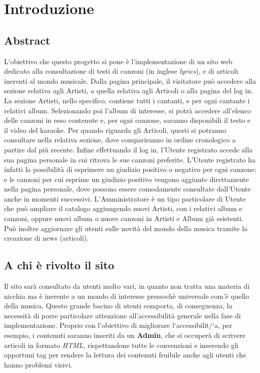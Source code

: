 \section{Introduzione}

\subsection{Abstract}
L`obiettivo che questo progetto si pone \`e l'implementazione di un sito web dedicato alla consultazione di testi di canzoni (in inglese \textit{lyrics}), e di articoli inerenti al mondo musicale. 
Dalla pagina principale, il visitatore pu\`o accedere alla sezione relativa agli Artisti, a quella relativa agli Articoli o alla pagina del log in.
La sezione Artisti, nello specifico, contiene tutti i cantanti, e per ogni cantante i relativi album. Selezionando poi l'album di interesse, si potr\`a accedere all'elenco delle canzoni in esso contenute e, per ogni canzone, saranno disponibili il testo e il video del karaoke.
Per quando riguarda gli Articoli, questi si potranno consultare nella relativa sezione, dove compariranno in ordine cronologico a partire dal pi\`u recente.
Infine effettuando il log in, l'Utente registrato accede alla sua pagina personale in cui ritrova le sue canzoni preferite. L'Utente registrato ha infatti la possibilit\`a di esprimere un giudizio positivo o negativo per ogni canzone; e le canzoni per cui esprime un giudizio positivo vengono aggiunte direttamente nella pagina personale, dove possono essere comodamente consultate dall'Utente anche in momenti successivi.
L'Amministratore è un tipo particolare di Utente che pu\`o ampliare il catalogo aggiungendo nuovi Artisti, con i relativi album e canzoni, oppure nuovi album o nuove canzoni in Artisti e Album gi\`a esistenti. Può inoltre aggiornare gli utenti sulle novità del mondo della musica tramite la creazione di news (articoli).


\subsection{A chi è rivolto il sito}
Il sito sar\`a consultato da utenti molto vari, in quanto non tratta una materia di nicchia ma \`e inerente a un mondo di interesse pressoch\`e universale com'\`e quello della musica. Questo grande bacino di utenti comporta, di conseguenza, la necessit\`a di porre particolare attenzione all'accessibilit\`a generale nella fase di implementazione. Proprio con l'obiettivo di migliorare l`accessibilit/`a, per esempio, i contenuti saranno inseriti da un \textbf{Admin}, che si occuperà di scrivere articoli in formato \textit{HTML}, rispettandone tutte le convenzioni e inserendo gli opportuni tag per rendere la lettura dei contenuti fruibile anche agli utenti che hanno problemi visivi.


